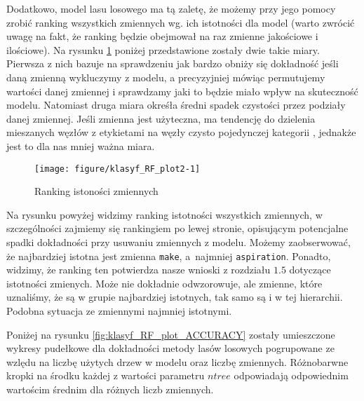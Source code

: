 \documentclass[12pt, a4paper]{article}\usepackage[]{graphicx}\usepackage[]{xcolor}
\makeatletter
\def\maxwidth{ %
  \ifdim\Gin@nat@width>\linewidth
    \linewidth
  \else
    \Gin@nat@width
  \fi
}
\newenvironment{knitrout}{}{} %
\makeatother
\begin{document}
\par
Dodatkowo, model lasu losowego ma tą zaletę, że możemy przy jego pomocy zrobić ranking wszystkich zmiennych wg. ich istotności dla model (warto zwrócić uwagę na fakt, że ranking będzie obejmował na raz zmienne jakościowe i ilościowe). Na rysunku \ref{fig:klasyf_RF_plot2} poniżej przedstawione zostały dwie takie miary. Pierwsza z nich bazuje na sprawdzeniu jak bardzo obniży się dokładność jeśli daną zmienną wykluczymy z modelu, a precyzyjniej mówiąc permutujemy wartości danej zmiennej i sprawdzamy jaki to będzie miało wpływ na skuteczność modelu. Natomiast druga miara okreśła średni spadek czystości przez podziały danej zmiennej. Jeśli zmienna jest użyteczna, ma tendencję do dzielenia mieszanych węzłów z etykietami na węzły czysto pojedynczej kategorii \cite{Gini}, jednakże jest to dla nas mniej ważna miara.
\begin{knitrout}
\color{fgcolor}\begin{figure}[H]

{\centering \texttt{[image: figure/klasyf\_RF\_plot2-1]} 

}

\caption[Ranking istoności zmiennych]{Ranking istoności zmiennych}\label{fig:klasyf_RF_plot2}
\end{figure}

\end{knitrout}
Na rysunku powyżej widzimy ranking istotności wszystkich zmiennych, w szczególności zajmiemy się rankingiem po lewej stronie, opisującym potencjalne spadki dokładności przy usuwaniu zmiennych z modelu. Możemy zaobserwować, że najbardziej istotna jest zmienna \texttt{make}, a~najmniej \texttt{aspiration}. Ponadto, widzimy, że ranking ten potwierdza nasze wnioski z rozdziału $1.5$ dotyczące istotności zmienych. Może nie dokładnie odwzorowuje, ale zmienne, które uznaliśmy, że są w grupie najbardziej istotnych, tak samo są i w tej hierarchii. Podobna sytuacja ze zmiennymi najmniej istotnymi.








Poniżej na rysunku \ref{fig:klasyf_RF_plot_ACCURACY} zostały umieszczone wykresy pudełkowe dla dokładności metody lasów losowych pogrupowane ze wzlędu na liczbę użytych drzew w modelu oraz liczbę zmiennych. Różnobarwne kropki na środku każdej z wartości parametru $ntree$ odpowiadają odpowiednim wartościm średnim dla różnych liczb zmiennych. 
\end{document}

